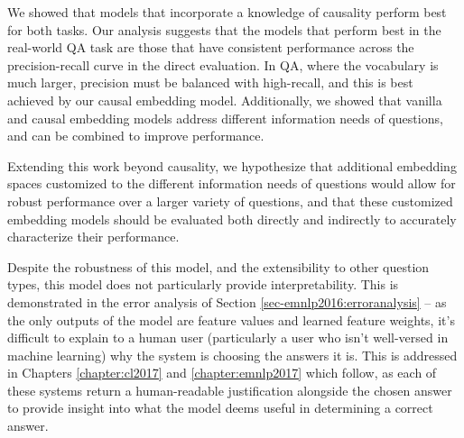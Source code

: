 We showed that models that incorporate a knowledge of causality perform best for both tasks. 
Our analysis suggests that the models that perform best in the real-world QA task are those that have consistent performance across the precision-recall curve in the direct evaluation.
In QA, where the vocabulary is much larger, precision must be balanced with high-recall, and this is best achieved by our causal embedding model.  Additionally, we showed that vanilla and causal embedding models address different information needs of questions, and can be combined to improve performance. 

Extending this work beyond causality, we hypothesize that additional embedding spaces customized to the different information needs of questions would allow for robust performance over a larger variety of questions, and that these customized embedding models should be evaluated both directly and indirectly to accurately characterize their performance. 

Despite the robustness of this model, and the extensibility to other question types, this model does not particularly provide interpretability.  This is demonstrated in the error analysis of Section \ref{sec-emnlp2016:erroranalysis} -- as the only outputs of the model are feature values and learned feature weights, it's difficult to explain to a human user (particularly a user who isn't well-versed in machine learning) why the system is choosing the answers it is.  This is addressed in Chapters \ref{chapter:cl2017} and \ref{chapter:emnlp2017} which follow, as each of these systems return a human-readable justification alongside the chosen answer to provide insight into what the model deems useful in determining a correct answer.


